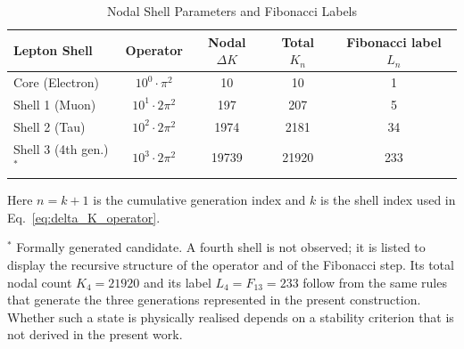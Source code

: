 \documentclass[10pt,a4paper]{article}
\begin{document}
\begin{table}[ht]
	\centering
	\caption{Nodal Shell Parameters and Fibonacci Labels}
	\label{tab:shell_parameters_verified}
	\begin{tabular}{lcccc}
		\toprule
		\textbf{Lepton Shell} & \textbf{Operator} & \textbf{Nodal $\Delta K$} & \textbf{Total $K_n$} & \textbf{Fibonacci label $L_n$} \\
		\midrule
		Core (Electron) & $10^0 \cdot \pi^2$              & 10    & 10    & 1 \\
		Shell 1 (Muon)  & $10^1 \cdot 2\pi^2$ & 197   & 207   & 5 \\
		Shell 2 (Tau)   & $10^2 \cdot 2\pi^2$ & 1974  & 2181  & 34 \\
		\midrule
		Shell 3 (4th gen.)$^\ast$ & $10^3 \cdot 2\pi^2$ & 19739 & 21920 & 233 \\
		\bottomrule
	\end{tabular}
	
	\vspace{4pt}
	\raggedright\footnotesize
	Here $n = k + 1$ is the cumulative generation index and $k$ is the
	shell index used in Eq.~\eqref{eq:delta_K_operator}.
	
	\vspace{2pt}
	$^\ast$ Formally generated candidate. A fourth shell is not observed;
	it is listed to display the recursive structure of the operator and
	of the Fibonacci step. Its total nodal count $K_4 = 21920$ and its
	label $L_4 = F_{13} = 233$ follow from the same rules that generate
	the three generations represented in the present construction.
	Whether such a state is physically realised depends on a stability
	criterion that is not derived in the present work.
\end{table}
\end{document}
